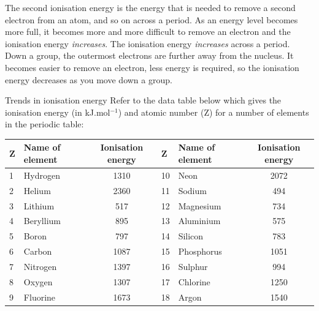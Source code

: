 

      \label{m38757*id261083}The second ionisation energy is the energy that is needed to remove a second electron from an atom, and so on across a period. As an energy level becomes more full, it becomes more and more difficult to remove an electron and the ionisation energy \textsl{increases}. The ionisation energy \textsl{increases} across a period. Down a group, the outermost electrons are further away from the nucleus. It becomes easier to remove an electron, less energy is required, so the ionisation energy decreases as you move down a group.\par 
\label{m38757*eip-865}

\begin{exercises}{Trends in ionisation energy}
Refer to the data table below which gives the ionisation energy (in kJ.mol$^{-1}$) and atomic number (Z) for a number of elements in the periodic table:\\

\begin{center}
\begin{tabular}{|l|l|c|l|l|c|}\hline
\textbf{Z} & Name of element & Ionisation energy & \textbf{Z} & Name of element & Ionisation energy \\\hline
1 & Hydrogen  & 1310 & 10 & Neon       & 2072 \\\hline
2 & Helium    & 2360 & 11 & Sodium     & 494  \\\hline
3 & Lithium   & 517  & 12 & Magnesium  & 734  \\\hline
4 & Beryllium & 895  & 13 & Aluminium  & 575  \\\hline
5 & Boron     & 797  & 14 & Silicon    & 783  \\\hline
6 & Carbon    & 1087 & 15 & Phosphorus & 1051 \\\hline
7 & Nitrogen  & 1397 & 16 & Sulphur    & 994  \\\hline
8 & Oxygen    & 1307 & 17 & Chlorine   & 1250 \\\hline
9 & Fluorine  & 1673 & 18 & Argon      & 1540 \\\hline
\end{tabular}
\end{center}


\end{exercises}

